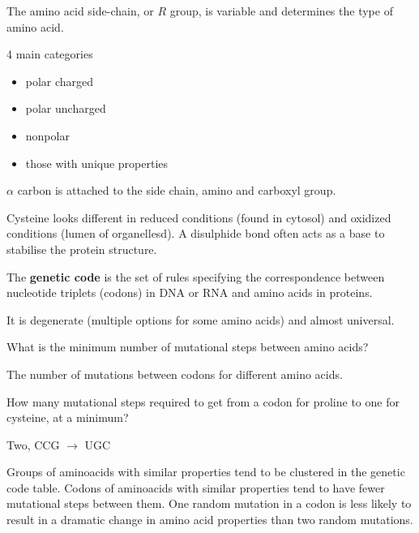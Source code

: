 \documentclass[11pt]{scrartcl}
\begin{document}
The amino acid side-chain, or $R$ group, is variable and determines
the type of amino acid.

4 main categories
\begin{itemize}
\item polar charged
\item polar uncharged
\item nonpolar
\item those with unique properties
\end{itemize}

$\alpha$ carbon is attached to the side chain, amino and carboxyl group.

Cysteine looks different in reduced conditions (found in cytosol) and
oxidized conditions (lumen of organellesd). A disulphide bond often
acts as a base to stabilise the protein structure.

\begin{definition}
  The \textbf{genetic code} is the set of rules specifying the
  correspondence between nucleotide triplets (codons) in DNA or RNA
  and amino acids in proteins.

  It is degenerate (multiple options for some amino acids) and almost
  universal.
\end{definition}

\begin{ques*}

What is the minimum number of mutational steps between amino acids?

\end{ques*}

\begin{answer*}

The number of mutations between codons for different amino acids.

\end{answer*}

\begin{example}

How many mutational steps required to get from a codon for proline to one for cysteine, at a minimum?

\end{example}

\begin{answer*}

Two, CCG $\to$ UGC

\end{answer*}

Groups of aminoacids with similar properties tend to be clustered in
the genetic code table. Codons of aminoacids with similar properties
tend to have fewer mutational steps between them.  One random mutation
in a codon is less likely to result in a dramatic change in amino acid
properties than two random mutations.
\end{document}
